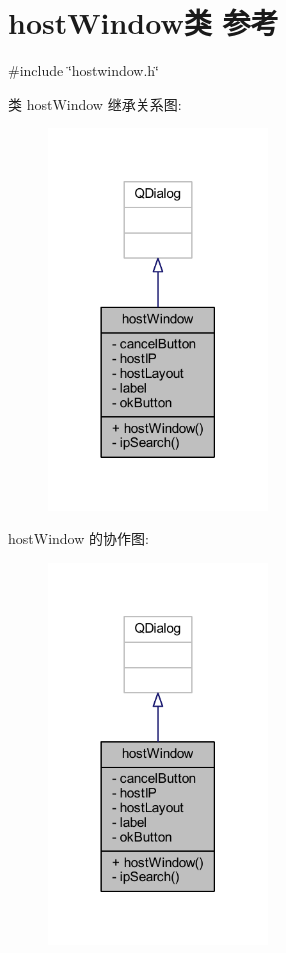 \hypertarget{classhost_window}{}\section{host\+Window类 参考}
\label{classhost_window}


{\ttfamily \#include \char`\"{}hostwindow.\+h\char`\"{}}



类 host\+Window 继承关系图\+:
\nopagebreak
\begin{figure}[H]
\begin{center}
\leavevmode
\includegraphics[width=165pt]{db/dc8/classhost_window__inherit__graph}
\end{center}
\end{figure}


host\+Window 的协作图\+:
\nopagebreak
\begin{figure}[H]
\begin{center}
\leavevmode
\includegraphics[width=165pt]{df/d46/classhost_window__coll__graph}
\end{center}
\end{figure}
